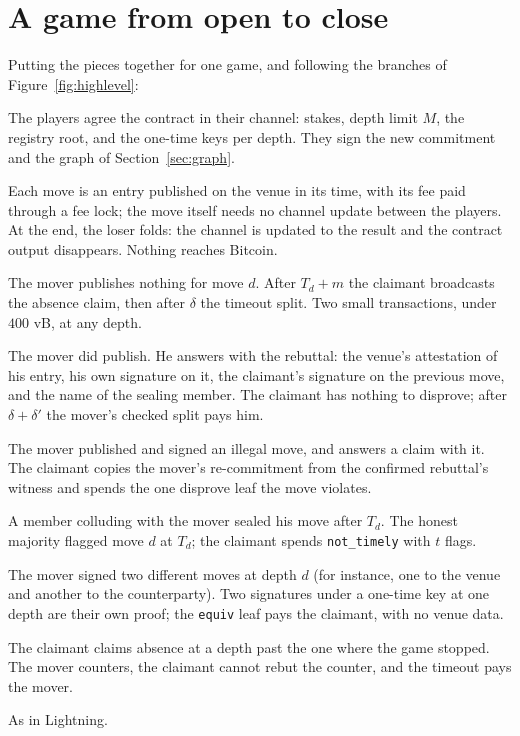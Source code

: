 \documentclass[11pt]{article}
\begin{document}
\section{A game from open to close}
\label{sec:lifecycle}

Putting the pieces together for one game, and following the branches of
Figure~\ref{fig:highlevel}:

\begin{description}[style=nextline]
\item[Open.] The players agree the contract in their channel: stakes,
  depth limit $M$, the registry root, and the one-time keys per depth.
  They sign the new commitment and the graph of Section~\ref{sec:graph}.
\item[Honest play.] Each move is an entry published on the venue in its
  time, with its fee paid through a fee lock; the move itself needs no
  channel update between the players. At the end, the loser folds: the
  channel is updated to the result and the contract output disappears.
  Nothing reaches Bitcoin.
\item[A stall.] The mover publishes nothing for move $d$. After $T_d+m$
  the claimant broadcasts the absence claim, then after $\delta$ the
  timeout split. Two small transactions, under $400$ vB, at any depth.
\item[A false stall claim.] The mover did publish. He answers with the
  rebuttal: the venue's attestation of his entry, his own signature
  on it, the claimant's signature on the previous move, and the name of
  the sealing member. The
  claimant has nothing to disprove; after $\delta + \delta'$ the mover's
  checked split pays him.
\item[An illegal move.] The mover published and signed an illegal move,
  and answers a claim with it. The claimant copies the mover's
  re-commitment from the confirmed rebuttal's witness and spends the
  one disprove leaf the move violates.
\item[A late move.] A member colluding with the mover sealed his move
  after $T_d$. The honest majority flagged move $d$ at $T_d$;
  the claimant spends \texttt{not\_timely} with $t$ flags.
\item[Equivocation by a player.] The mover signed two different moves at
  depth $d$ (for instance, one to the venue and another to the
  counterparty). Two signatures under a one-time key at one depth are
  their own proof; the \texttt{equiv} leaf pays the claimant, with no
  venue data.
\item[A claim at the wrong depth.] The claimant claims absence at a
  depth past the one where the game stopped. The mover counters, the
  claimant cannot rebut the counter, and the timeout pays the mover.
\item[A revoked state.] As in Lightning.
\end{description}
\end{document}
